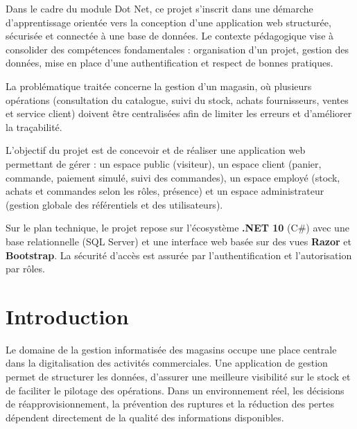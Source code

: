 \documentclass[12pt,a4paper]{report}
\begin{document}
Dans le cadre du module Dot Net, ce projet s’inscrit dans une démarche d’apprentissage orientée vers la conception d’une application web structurée, sécurisée et connectée à une base de données. Le contexte pédagogique vise à consolider des compétences fondamentales : organisation d’un projet, gestion des données, mise en place d’une authentification et respect de bonnes pratiques.

La problématique traitée concerne la gestion d’un magasin, où plusieurs opérations (consultation du catalogue, suivi du stock, achats fournisseurs, ventes et service client) doivent être centralisées afin de limiter les erreurs et d’améliorer la traçabilité.

L’objectif du projet est de concevoir et de réaliser une application web permettant de gérer : un espace public (visiteur), un espace client (panier, commande, paiement simulé, suivi des commandes), un espace employé (stock, achats et commandes selon les rôles, présence) et un espace administrateur (gestion globale des référentiels et des utilisateurs).

Sur le plan technique, le projet repose sur l’écosystème \textbf{.NET 10} (C\#) avec une base relationnelle (SQL Server) et une interface web basée sur des vues \textbf{Razor} et \textbf{Bootstrap}. La sécurité d’accès est assurée par l’authentification et l’autorisation par rôles.

\tableofcontents
{}

\listoffigures
{}

\newpage
{}

\chapter*{Introduction}

Le domaine de la gestion informatisée des magasins occupe une place centrale dans la digitalisation des activités commerciales. Une application de gestion permet de structurer les données, d’assurer une meilleure visibilité sur le stock et de faciliter le pilotage des opérations. Dans un environnement réel, les décisions de réapprovisionnement, la prévention des ruptures et la réduction des pertes dépendent directement de la qualité des informations disponibles.
\end{document}
